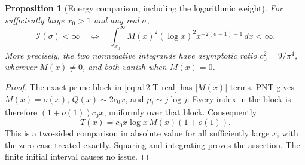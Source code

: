 \documentclass[11pt]{amsart}
\numberwithin{equation}{section}
\theoremstyle{plain}
\newtheorem{proposition}[theorem]{Proposition}
\theoremstyle{definition}
\theoremstyle{remark}
\begin{document}
\begin{proposition}[Energy comparison, including the logarithmic weight]
\label{prop:a12-energy-comparison}
For sufficiently large $x_0>1$ and any real $\sigma$,
\begin{equation}
\label{eq:a12-energy-comparison}
\mathcal I(\sigma)<\infty
\quad\Longleftrightarrow\quad
\int_{x_0}^\infty M(x)^2(\log x)^2
x^{-2(\sigma-1)-1}\,dx<\infty.
\end{equation}
More precisely, the two nonnegative integrands have asymptotic ratio
$c_0^2=9/\pi^4$, wherever $M(x)\ne0$, and both vanish when $M(x)=0$.
\end{proposition}
\begin{proof}
The exact prime block in \eqref{eq:a12-T-real} has $|M(x)|$ terms.
PNT gives $M(x)=o(x)$, $Q(x)\sim2c_0x$, and
$p_j\sim j\log j$. Every index in the block is therefore
$(1+o(1))c_0x$, uniformly over that block. Consequently
\begin{equation}
\label{eq:a12-T-asymptotic}
T(x)=c_0x\log x\,M(x)(1+o(1)).
\end{equation}
This is a two-sided comparison in absolute value for all sufficiently
large $x$, with the zero case treated exactly. Squaring and integrating
proves the assertion. The finite initial interval causes no issue.
\end{proof}
\end{document}
